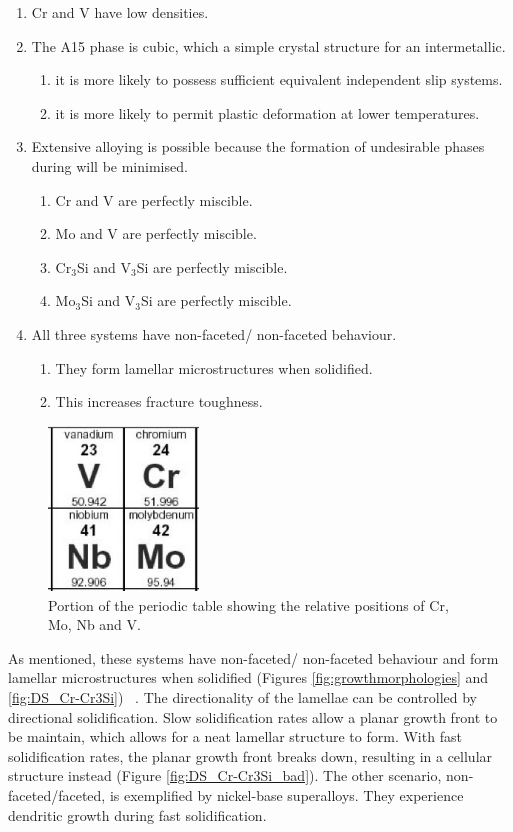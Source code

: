 \begin{enumerate}
\item Cr and V have low densities.
\item The A15 phase is cubic, which a simple crystal structure for an intermetallic.
\begin{enumerate}
\item it is more likely to possess sufficient equivalent independent slip systems.
\item it is more likely to permit plastic deformation at lower temperatures.
\end{enumerate}
\item Extensive alloying is possible because the formation of undesirable phases during will be minimised.
\begin{enumerate}
\item Cr and V are perfectly miscible.
\item Mo and V are perfectly miscible.
\item Cr$_3$Si and V$_3$Si are perfectly miscible.
\item Mo$_3$Si and V$_3$Si are perfectly miscible.
\end{enumerate}
\item All three systems have non-faceted/ non-faceted behaviour.
\begin{enumerate}
\item They form lamellar microstructures when solidified.
\item This increases fracture toughness.
\end{enumerate}
\end{enumerate}    
%
\begin{figure}[H]
\begin{center}
\includegraphics[width=4cm]{periodictable}
\caption{Portion of the periodic table showing the relative positions of Cr, Mo, Nb and V.}
\label{fig:periodictable}
\end{center}
\end{figure}
%
As mentioned, these systems have non-faceted/ non-faceted behaviour and form lamellar microstructures when solidified (Figures \ref{fig:growthmorphologies} and \ref{fig:DS_Cr-Cr3Si}) ~\cite{bei03}. The directionality of the lamellae can be controlled by directional solidification.  Slow solidification rates allow a planar growth front to be maintain, which allows for a neat lamellar structure to form. With fast solidification rates, the planar growth front breaks down, resulting in a cellular structure instead (Figure \ref{fig:DS_Cr-Cr3Si_bad}). The other scenario, non-faceted/faceted, is exemplified by nickel-base superalloys. They experience dendritic growth during fast solidification.
